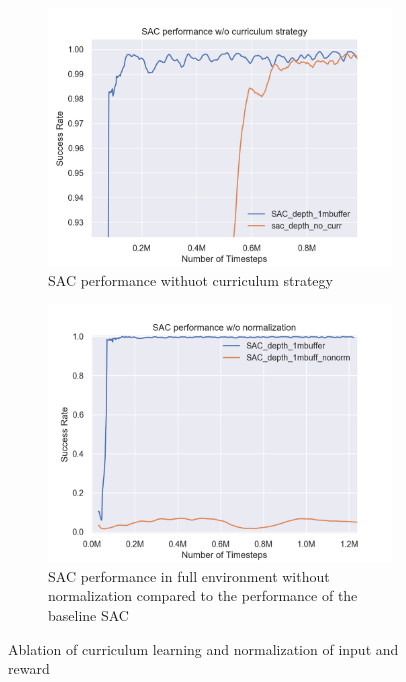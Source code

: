 \begin{figure}[htbp]
    \begin{subfigure}{0.49\textwidth}
        \includegraphics[width=\linewidth]{figures/ablation/SAC_performance_wo_curriculum_strategy}
        \caption{SAC performance withuot curriculum strategy} \label{fig:table}
    \end{subfigure}%
    \hspace*{\fill}   %
    \begin{subfigure}{0.49\textwidth}
        \includegraphics[width=\linewidth]{figures/ablation/SAC_performance_wo_normalization}
        \caption{SAC performance in full environment without normalization compared to the performance of the baseline SAC} \label{fig:nonorm}
    \end{subfigure}%
    \hspace*{\fill}   %


\caption{ Ablation of curriculum learning and normalization of input and reward \label{fig:scenes}}
\end{figure}



